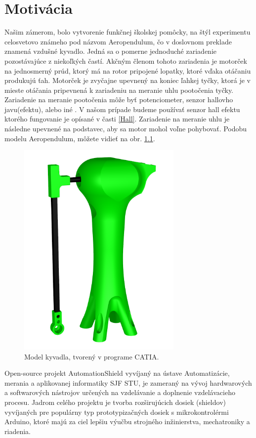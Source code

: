 \chapter{Motivácia}

Našim zámerom, bolo vytvorenie funkčnej školskej pomôcky, na štýl experimentu celosvetovo známeho pod názvom Aeropendulum, čo v doslovnom preklade znamená vzdušné kyvadlo. Jedná sa o pomerne jednoduché zariadenie pozostávajúce z niekoľkých častí. Akčným členom tohoto zariadenia je motorček na jednosmerný prúd, ktorý má na rotor pripojené lopatky, ktoré vďaka otáčaniu produkujú ťah. Motorček je zvyčajne upevnený na koniec ľahkej tyčky, ktorá je v mieste otáčania pripevnená k zariadeniu na meranie uhlu pootočenia tyčky. Zariadenie na meranie pootočenia môže byť potenciometer, senzor hallovho javu(efektu), alebo iné \cite{senzor}. V našom prípade budeme používať senzor hall efektu ktorého fungovanie je opísané v časti \ref{Hall}. Zariadenie na meranie uhlu je následne upevnené na podstavec, aby sa motor mohol voľne pohybovať. Podobu modelu Aeropendulum, môžete vidieť na obr. \ref{OBRAZOK 1.1}.

\begin{figure}[!tbh]
	\centering
	\includegraphics[width=80mm]{obr/AeroCatiaa.png}
	\caption{Model kyvadla, tvorený v programe CATIA.}\label{OBRAZOK 1.1}
\end{figure}

\newpage
Open-source projekt AutomationShield vyvíjaný na ústave Automatizácie, merania a aplikovanej informatiky SJF STU, je zameraný na vývoj hardwarových a softwarových nástrojov určených na vzdelávanie a doplnenie vzdelávacieho procesu. Jadrom celého projektu je tvorba rozširujúcich dosiek (shieldov) vyvíjaných pre populárny typ prototypizačných dosiek s mikrokontrolérmi Arduino, ktoré majú za ciel lepšiu výučbu strojného inžinierstva, mechatroniky a riadenia\cite{Auto}.


